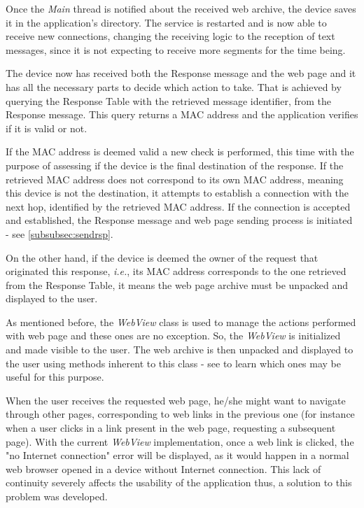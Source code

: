 Once the \textit{Main} thread is notified about the received web archive, the device saves it in the application's directory. The service is restarted and is now able to receive new connections, changing the receiving logic to the reception of text messages, since it is not expecting to receive more segments for the time being.

The device now has received both the Response message and the web page and it has all the necessary parts to decide which action to take. That is achieved by querying the Response Table with the retrieved message identifier, from the Response message. This query returns a \gls{MAC} address and the application verifies if it is valid or not.

If the \gls{MAC} address is deemed valid a new check is performed, this time with the purpose of assessing if the device is the final destination of the response. If the retrieved \gls{MAC} address does not correspond to its own \gls{MAC} address, meaning this device is not the destination, it attempts to establish a connection with the next hop, identified by the retrieved \gls{MAC} address. If the connection is accepted and established, the Response message and web page sending process is initiated - see \ref{subsubsec:sendrsp}.

On the other hand, if the device is deemed the owner of the request that originated this response, \textit{i.e.}, its \gls{MAC} address corresponds to the one retrieved from the Response Table, it means the web page archive must be unpacked and displayed to the user.

As mentioned before, the \textit{WebView} class is used to manage the actions performed with web page and these ones are no exception. So, the \textit{WebView} is initialized and made visible to the user. The web archive is then unpacked and displayed to the user using methods inherent to this class - see \cite{webview} to learn which ones may be useful for this purpose.

When the user receives the requested web page, he/she might want to navigate through other pages, corresponding to web links in the previous one (for instance when a user clicks in a link present in the web page, requesting a subsequent page). With the current \textit{WebView} implementation, once a web link is clicked, the "no Internet connection" error will be displayed, as it would happen in a normal web browser opened in a device without Internet connection. This lack of continuity severely affects the usability of the application thus, a solution to this problem was developed.

